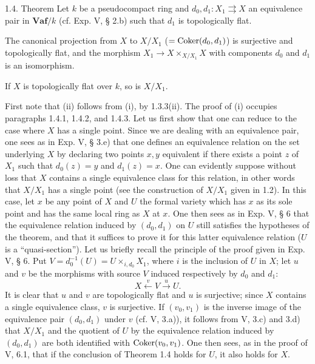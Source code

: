\begin{enonce}{1.4. Theorem}{}\label{VIIB.1.4}
Let $k$ be a pseudocompact ring and $d_0,d_1:X_1\rightrightarrows X$ an equivalence pair in $\mathbf{Vaf}/k$ (cf. Exp. V, § 2.b) such that $d_1$ is topologically flat.
\begin{enumeratei}
\item The canonical projection from $X$ to $X/X_1$ ($=\operatorname{Coker}(d_0,d_1)$) is surjective and topologically flat, and the morphism $X_1\to X\times_{X/X_1}X$ with components $d_0$ and $d_1$ is an isomorphism.
\item If $X$ is topologically flat over $k$, so is $X/X_1$.
\end{enumeratei}
\end{enonce}
First note that (ii) follows from (i), by 1.3.3(ii). The proof of (i) occupies paragraphs 1.4.1, 1.4.2, and 1.4.3.
Let us first show that one can reduce to the case where $X$ has a single point. Since we are dealing with an equivalence pair, one sees as in Exp. V, § 3.e) that one defines an equivalence relation on the set underlying $X$ by declaring two points $x,y$ equivalent if there exists a point $z$ of $X_1$ such that $d_0(z)=y$ and $d_1(z)=x$. One can evidently suppose without loss that $X$ contains a single equivalence class for this relation, in other words that $X/X_1$ has a single point (see the construction of $X/X_1$ given in 1.2).
In this case, let $x$ be any point of $X$ and $U$ the formal variety which has $x$ as its sole point and has the same local ring as $X$ at $x$. One then sees as in Exp. V, § 6 that the equivalence relation induced by $(d_0,d_1)$ on $U$ still satisfies the hypotheses of the theorem, and that it suffices to prove it for this latter equivalence relation ($U$ is a ``quasi-section'').
Let us briefly recall the principle of the proof given in Exp. V, § 6. Put $V=d_0^{-1}(U)=U\times_{i,d_0}X_1$, where $i$ is the inclusion of $U$ in $X$; let $u$ and $v$ be the morphisms with source $V$ induced respectively by $d_0$ and $d_1$:
\[
X\xleftarrow{v}V\xrightarrow{u}U.
\]
It is clear that $u$ and $v$ are topologically flat and $u$ is surjective; since $X$ contains a single equivalence class, $v$ is surjective. If $(v_0,v_1)$ is the inverse image of the equivalence pair $(d_0,d_1)$ under $v$ (cf. V, 3.a)), it follows from V, 3.c) and 3.d) that $X/X_1$ and the quotient of $U$ by the equivalence relation induced by $(d_0,d_1)$ are both identified with $\operatorname{Coker}(v_0,v_1)$. One then sees, as in the proof of V, 6.1, that if the conclusion of Theorem 1.4 holds for $U$, it also holds for $X$.


